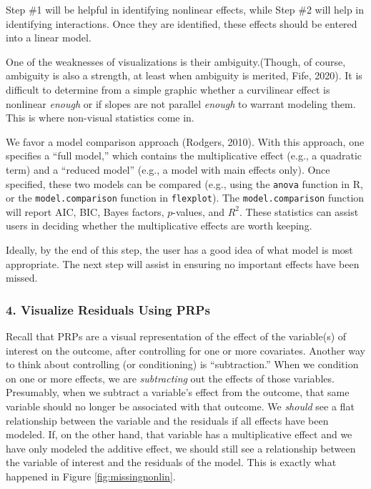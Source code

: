 \documentclass[
  man,floatsintext]{apa6}
\begin{document}
Step \#1 will be helpful in identifying nonlinear effects, while Step \#2 will help in identifying interactions. Once they are identified, these effects should be entered into a linear model.

One of the weaknesses of visualizations is their ambiguity.(Though, of course, ambiguity is also a strength, at least when ambiguity is merited, Fife, 2020). It is difficult to determine from a simple graphic whether a curvilinear effect is nonlinear \emph{enough} or if slopes are not parallel \emph{enough} to warrant modeling them. This is where non-visual statistics come in.

We favor a model comparison approach (Rodgers, 2010). With this approach, one specifies a ``full model,'' which contains the multiplicative effect (e.g., a quadratic term) and a ``reduced model'' (e.g., a model with main effects only). Once specified, these two models can be compared (e.g., using the \texttt{anova} function in R, or the \texttt{model.comparison} function in \texttt{flexplot}). The \texttt{model.comparison} function will report AIC, BIC, Bayes factors, \(p\)-values, and \(R^2\). These statistics can assist users in deciding whether the multiplicative effects are worth keeping.

Ideally, by the end of this step, the user has a good idea of what model is most appropriate. The next step will assist in ensuring no important effects have been missed.

\subsubsection{4. Visualize Residuals Using PRPs}\label{visualize-residuals-using-prps}

Recall that PRPs are a visual representation of the effect of the variable(s) of interest on the outcome, after controlling for one or more covariates. Another way to think about controlling (or conditioning) is ``subtraction.'' When we condition on one or more effects, we are \emph{subtracting} out the effects of those variables. Presumably, when we subtract a variable's effect from the outcome, that same variable should no longer be associated with that outcome. We \emph{should} see a flat relationship between the variable and the residuals if all effects have been modeled. If, on the other hand, that variable has a multiplicative effect and we have only modeled the additive effect, we should still see a relationship between the variable of interest and the residuals of the model. This is exactly what happened in Figure \ref{fig:missingnonlin}.
\end{document}
